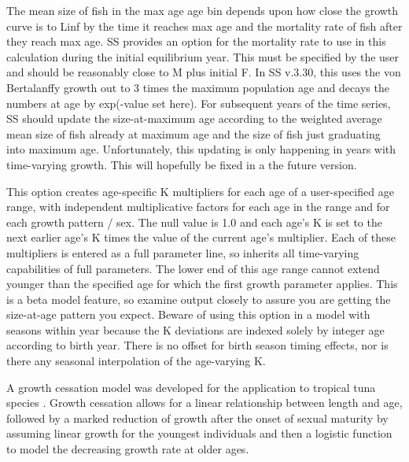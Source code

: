 The mean size of fish in the max age age bin depends upon how close the growth curve is to Linf by the time it reaches max age and the mortality rate of fish after they reach max age. SS provides an option for the mortality rate to use in this calculation during the initial equilibrium year. This must be specified by the user and should be reasonably close to M plus initial F. In SS v.3.30, this uses the von Bertalanffy growth out to 3 times the maximum population age and decays the numbers at age by exp(-value set here). For subsequent years of the time series, SS should update the size-at-maximum age according to the weighted average mean size of fish already at maximum age and the size of fish just graduating into maximum age.  Unfortunately, this updating is only happening in years with time-varying growth. This will hopefully be fixed in a the future version.
	
This option creates age-specific K multipliers for each age of a user-specified age range, with independent multiplicative factors for each age in the range and for each growth pattern / sex. The null value is 1.0 and each age's K is set to the next earlier age's K times the value of the current age's multiplier. Each of these multipliers is entered as a full parameter line, so inherits all time-varying capabilities of full parameters. The lower end of this age range cannot extend younger than the specified age for which the first growth parameter applies. This is a beta model feature, so examine output closely to assure you are getting the size-at-age pattern you expect.  Beware of using this option in a model with seasons within year because the K deviations are indexed solely by integer age according to birth year.  There is no offset for birth season timing effects, nor is there any seasonal interpolation of the age-varying K.

\hypertarget{GrowthCessation}{}
A growth cessation model was developed for the application to tropical tuna species \citep{maunder-growth-2018}. Growth cessation allows for a linear relationship between length and age, followed by a marked reduction of growth after the onset of sexual maturity by assuming linear growth for the youngest individuals and then a logistic function to model the decreasing growth rate at older ages.

